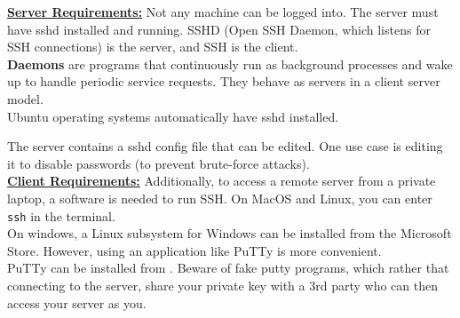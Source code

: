 \documentclass[a4paper, 10pt]{article}
\begin{document}
                \underline{\textbf{Server Requirements:}}
                Not any machine can be logged into. The server must have sshd installed and running. SSHD (Open SSH Daemon, which listens for SSH connections) is the server, and SSH is the client.\\
                \textbf{Daemons} are programs that continuously run as background processes and wake up to handle periodic service requests. They behave as servers in a client server model.\\

                Ubuntu operating systems automatically have sshd installed. 

                The server contains a sshd config file that can be edited. One use case is editing it to disable passwords (to prevent brute-force attacks).\\

                \underline{\textbf{Client Requirements:}}
                Additionally, to access a remote server from a private laptop, a software is needed to run SSH.
                On MacOS and Linux, you can enter \texttt{ssh} in the terminal.\\
                On windows, a Linux subsystem for Windows can be installed from the Microsoft Store. However, using an application like PuTTy is more convenient.\\
                PuTTy can be installed from . Beware of fake putty programs, which rather that connecting to the server, share your private key with a 3rd party who can then access your server as you.\\
\end{document}

